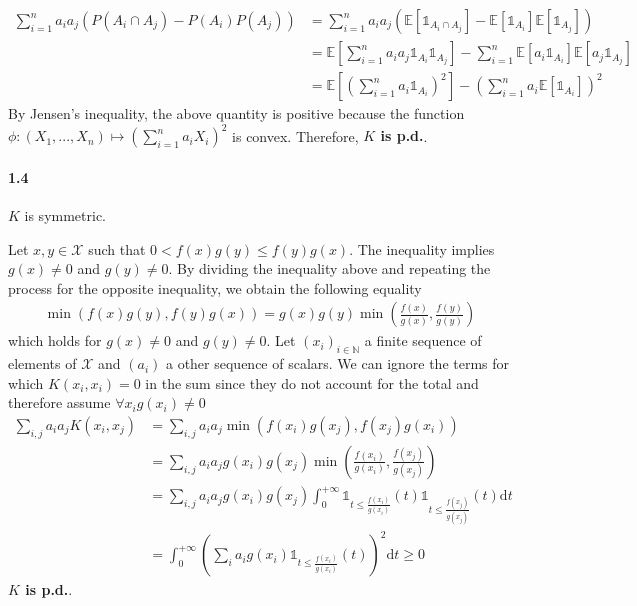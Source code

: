 \documentclass[10pt]{article}
\begin{document}
    \begin{align*}
        \sum_{i=1}^n a_i a_j (P(A_i \cap A_j) - P(A_i) P(A_j)) &= 
        \sum_{i=1}^n a_i a_j (\mathbb{E}[\mathds{1}_{A_i \cap A_j}] - 
        \mathbb{E}[\mathds{1}_{A_i}] \mathbb{E}[\mathds{1}_{A_j}])\\
        &= \mathbb{E}\left[\sum_{i=1}^n a_i a_j \mathds{1}_{A_i}\mathds{1}_{A_j} 
        \right] - \sum_{i=1}^n \mathbb{E}[a_i\mathds{1}_{A_i}] 
        \mathbb{E}[a_j\mathds{1}_{A_j}]\\
        &= \mathbb{E}\left[\left(\sum_{i=1}^n a_i\mathds{1}_{A_i}\right)^2
        \right] - \left(\sum_{i=1}^n a_i \mathbb{E}[\mathds{1}_{A_i}] \right)^2
    \end{align*}
    By Jensen's inequality, the above quantity is positive because the function
    $\phi: (X_1, ..., X_n) \mapsto (\sum_{i=1}^n a_i X_i)^2$ is convex. 
    Therefore, \textbf{$K$ is p.d.}.

    \paragraph{1.4} $K$ is symmetric.
    
    Let $x, y \in \mathcal{X}$ such that $0 < f(x)g(y) \leq 
    f(y)g(x)$. The inequality implies $g(x) \neq 0$ and $g(y) \neq 0$.
    By dividing the inequality above and repeating the process for the opposite 
    inequality, we obtain the following equality
    \begin{align*}
        \min(f(x)g(y), f(y)g(x)) = g(x)g(y)\min\left(\frac{f(x)}{g(x)}, 
        \frac{f(y)}{g(y)}\right)
    \end{align*}
    which holds for $g(x) \neq 0$ and $g(y) \neq 0$.
    Let $(x_i)_{i\in \mathbb{N}}$ a finite sequence of elements of $\mathcal{X}$ 
    and $(a_i)$ a other sequence of scalars. We can ignore the terms for which 
    $K(x_i, x_i) = 0$ in the sum since they do not account for the total and 
    therefore assume $\forall x_i g(x_i) \neq 0$  
    \begin{align*}
        \sum_{i,j} a_i a_j K(x_i, x_j) &= \sum_{i,j} a_i a_j \min(f(x_i)g(x_j), 
        f(x_j)g(x_i))\\
        &= \sum_{i,j} a_i a_j g(x_i)g(x_j)\min\left(\frac{f(x_i)}{g(x_i)}, 
        \frac{f(x_j)}{g(x_j)}\right)\\
        &= \sum_{i,j} a_i a_j g(x_i)g(x_j)\int_0^{+\infty} \mathds{1}_{t 
        \leq \frac{f(x_i)}{g(x_i)}}(t) \mathds{1}_{t 
        \leq \frac{f(x_j)}{g(x_j)}}(t) \text{d}t \\
        &= \int_0^{+\infty} \left(\sum_i a_i g(x_i)\mathds{1}_{t 
        \leq \frac{f(x_i)}{g(x_i)}}(t)\right)^2\text{d}t \geq 0
    \end{align*}
    \textbf{$K$ is p.d.}.
\end{document}
